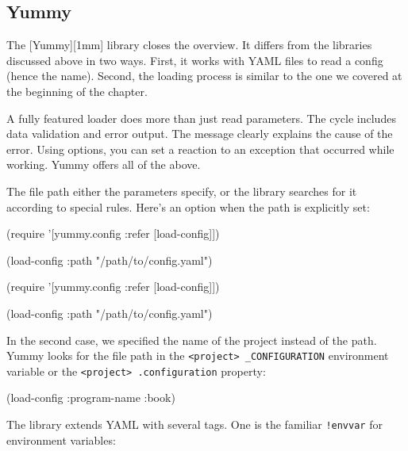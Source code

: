 \subsection{Yummy}


The [Yummy][1mm] library closes the overview. It differs from the libraries discussed above in two ways. First, it works with YAML files to read a config (hence the name). Second, the loading process is similar to the one we covered at the beginning of the chapter.

A fully featured loader does more than just read parameters. The cycle includes data validation and error output. The message clearly explains the cause of the error. Using options, you can set a reaction to an exception that occurred while working. Yummy offers all of the above.

The file path either the parameters specify, or the library searches for it according to special rules. Here's an option when the path is explicitly set:

\ifnarrow

\begin{clojure}
(require
  '[yummy.config :refer [load-config]])

(load-config
  {:path "/path/to/config.yaml"})
\end{clojure}

\else

\begin{clojure}
(require '[yummy.config :refer [load-config]])

(load-config {:path "/path/to/config.yaml"})
\end{clojure}

\fi

In the second case, we specified the name of the project instead of the path. Yummy looks for the file path in the \verb|<project> _CONFIGURATION| environment variable or the \verb|<project> .configuration| property:


\begin{clojure}
(load-config {:program-name :book})
\end{clojure}

The library extends YAML with several tags. One is the familiar \verb|!envvar| for environment variables:

